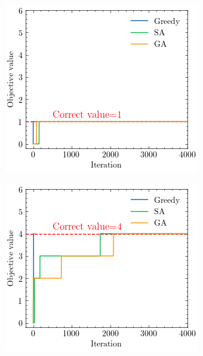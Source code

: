 \documentclass{article}
\begin{document}
\begin{figure}[htbp]
    \centering
    \begin{subfigure}[b]{0.32\textwidth}
        \includegraphics[width=\textwidth]{e4-alg.png}
        \caption{}
        \label{fig:e4-alg}
    \end{subfigure}
    \begin{subfigure}[b]{0.32\textwidth}
        \includegraphics[width=\textwidth]{f4-alg}

\end{subfigure}
\end{figure}
\end{document}
